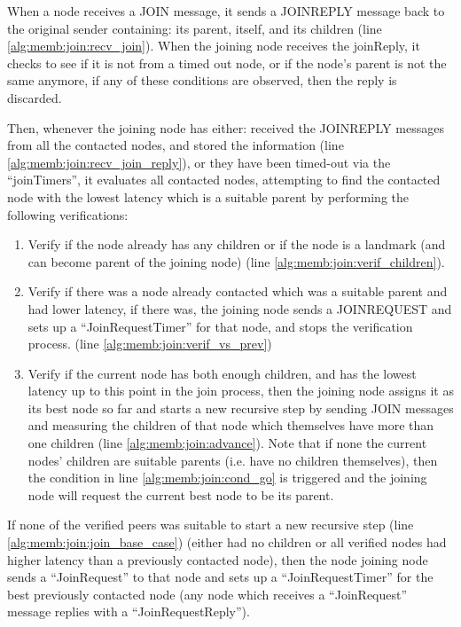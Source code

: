 When a node receives a JOIN message, it sends a JOINREPLY message back to the original sender containing: its parent, itself, and its children (line \ref{alg:memb:join:recv_join}). When the joining node receives the joinReply, it checks to see if it is not from a timed out node, or if the node's parent is not the same anymore, if any of these conditions are observed, then the reply is discarded. 

Then, whenever the joining node has either: received the JOINREPLY messages from all the contacted nodes, and stored the information (line \ref{alg:memb:join:recv_join_reply}), or they have been timed-out via the ``joinTimers'', it evaluates all contacted nodes, attempting to find the contacted node with the lowest latency which is a suitable parent by performing the following verifications:

\begin{enumerate}
    \item Verify if the node already has any children or if the node is a landmark (and can become parent of the joining node) (line \ref{alg:memb:join:verif_children}).
    
    \item Verify if there was a node already contacted which was a suitable parent and had lower latency, if there was, the joining node sends a JOINREQUEST and sets up a ``JoinRequestTimer'' for that node, and stops the verification process. (line \ref{alg:memb:join:verif_vs_prev})

    \item Verify if the current node has both enough children, and has the lowest latency up to this point in the join process, then the joining node assigns it as its best node so far and starts a new recursive step by sending JOIN messages and measuring the children of that node which themselves have more than one children (line \ref{alg:memb:join:advance}). Note that if none the current nodes' children are suitable parents (i.e. have no children themselves), then the condition in line \ref{alg:memb:join:cond_go} is triggered and the joining node will request the current best node to be its parent.
\end{enumerate}

If none of the verified peers was suitable to start a new recursive step (line \ref{alg:memb:join:join_base_case}) (either had no children or all verified nodes had higher latency than a previously contacted node), then the node joining node sends a ``JoinRequest'' to that node and sets up a ``JoinRequestTimer'' for the best previously contacted node (any node which receives a ``JoinRequest'' message replies with a ``JoinRequestReply''). 

